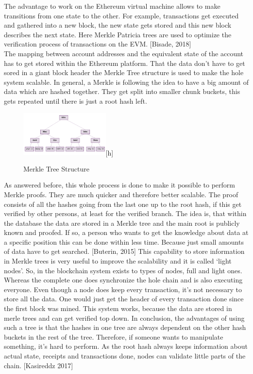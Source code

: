 The advantage to work on the Ethereum virtual machine allows to make transitions from one state to the other. For example, transactions get executed and gathered into a new block, the new state gets stored and this new block describes the next state. Here Merkle Patricia trees are used to optimize the verification process of transactions on the EVM. [Bisade, 2018]
\\
The mapping between account addresses and the equivalent state of the account has to get stored within the Ethereum platform. That the data don’t have to get sored in a giant block header the Merkle Tree structure is used to make the hole system scalable. In general, a Merkle is following the idea to have a big amount of data which are hashed together. They get split into smaller chunk buckets, this gets repeated until there is just a root hash left. \cite{Butin2015}

\begin{figure}[ht]
\centering 
\caption{Merkle Tree Structure}
\includegraphics[width=0.4\textwidth]{MerkleTree1}[h]
\end{figure}

As answered before, this whole process is done to make it possible to perform Merkle proofs. They are much quicker and therefore better scalable. The proof consists of all the hashes going from the last one up to the root hash, if this get verified by other persons, at least for the verified branch. The idea is, that within the database the data are stored in a Merkle tree and the main root is publicly known and proofed. If so, a person who wants to get the knowledge about data at a specific position this can be done within less time. Because just small amounts of data have to get searched. [Buterin, 2015]
This capability to store information in Merkle trees is very useful to improve the scalability and it is called ‘light nodes’. So, in the blockchain system exists to types of nodes, full and light ones. Whereas the complete one does synchronize the hole chain and is also executing everyone. Even though a node does keep every transaction, it’s not necessary to store all the data. One would just get the header of every transaction done since the first block was mined. This system works, because the data are stored in merle trees and can get verified top down. In conclusion, the advantages of using such a tree is that the hashes in one tree are always dependent on the other hash buckets in the rest of the tree. Therefore, if someone wants to manipulate something, it’s hard to perform. As the root hash always keeps information about actual state, receipts and transactions done, nodes can validate little parts of the chain. [Kasireddz 2017]


